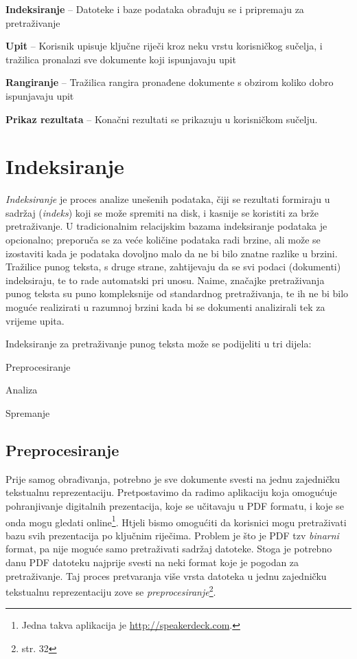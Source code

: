 \documentclass[a4paper,twoside,12pt]{scrreprt}
\begin{document}
\begin{compactenum}
  \item \textbf{Indeksiranje} – Datoteke i baze podataka obrađuju se i pripremaju za pretraživanje
  \item \textbf{Upit} – Korisnik upisuje ključne riječi kroz neku vrstu korisničkog sučelja, i tražilica pronalazi sve dokumente koji ispunjavaju upit
  \item \textbf{Rangiranje} – Tražilica rangira pronađene dokumente s obzirom koliko dobro ispunjavaju upit
  \item \textbf{Prikaz rezultata} – Konačni rezultati se prikazuju u korisničkom sučelju.
\end{compactenum}

\section{Indeksiranje}
\label{indexing}

\textit{Indeksiranje} je proces analize unešenih podataka, čiji se rezultati formiraju u sadržaj (\textit{indeks}) koji se može spremiti na disk, i kasnije se koristiti za brže pretraživanje. U tradicionalnim relacijskim bazama indeksiranje podataka je opcionalno; preporuča se za veće količine podataka radi brzine, ali može se izostaviti kada je podataka dovoljno malo da ne bi bilo znatne razlike u brzini. Tražilice punog teksta, s druge strane, zahtijevaju da se svi podaci (dokumenti) indeksiraju, te to rade automatski pri unosu. Naime, značajke pretraživanja punog teksta su puno kompleksnije od standardnog pretraživanja, te ih ne bi bilo moguće realizirati u razumnoj brzini kada bi se dokumenti analizirali tek za vrijeme upita.

Indeksiranje za pretraživanje punog teksta može se podijeliti u tri dijela:

\begin{compactenum}
  \item Preprocesiranje
  \item Analiza
  \item Spremanje
\end{compactenum}

\subsection{Preprocesiranje}

Prije samog obrađivanja, potrebno je sve dokumente svesti na jednu zajedničku tekstualnu reprezentaciju. Pretpostavimo da radimo aplikaciju koja omogućuje pohranjivanje digitalnih prezentacija, koje se učitavaju u PDF formatu, i koje se onda mogu gledati online\footnote{Jedna takva aplikacija je \url{http://speakerdeck.com}.}. Htjeli bismo omogućiti da korisnici mogu pretraživati bazu svih prezentacija po ključnim riječima. Problem je što je PDF tzv \textit{binarni} format, pa nije moguće samo pretraživati sadržaj datoteke. Stoga je potrebno danu PDF datoteku najprije svesti na neki format koje je pogodan za pretraživanje. Taj proces pretvaranja više vrsta datoteka u jednu zajedničku tekstualnu reprezentaciju zove se \textit{preprocesiranje}\footnote{\cite{taming} str. 32}.
\end{document}
